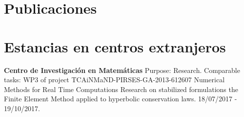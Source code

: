 \documentclass[12pt]{article}
\begin{document}






\section{Publicaciones}
\nocite{*}
\printbibliography[heading={subbibliography}, title={Artículos en revistas}, type=article]
\printbibliography[heading={subbibliography}, title={Tesis}, type=thesis]
\printbibliography[heading={subbibliography}, title={Presentaciones en congresos}, type=inproceedings]


\section{Estancias en centros extranjeros}
\textbf{Centro de Investigación en Matemáticas} Purpose: Research. Comparable tasks: WP3 of project
TCAiNMaND-PIRSES-GA-2013-612607 Numerical Methods for Real Time Computations Research on stabilized
formulations the Finite Element Method applied to hyperbolic conservation laws. 18/07/2017 - 19/10/2017.
\end{document}
